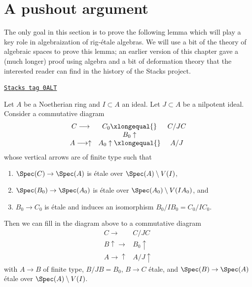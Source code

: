 \section{A pushout argument}
\label{restricted-section-approximation}
The only goal in this section is to prove the following lemma which
will play a key role in algebraization of rig-\'etale algebras.
We will use a bit of the theory of algebraic spaces to prove this lemma;
an earlier version of this chapter gave a (much longer) proof using algebra
and a bit of deformation theory that the interested reader can find in
the history of the Stacks project.

\begin{lemma}
\label{restricted-lemma-lift-approximation}
\href{https://stacks.math.columbia.edu/tag/0ALT}{\texttt{Stacks tag 0ALT}}

Let $A$ be a Noetherian ring and $I \subset A$ an ideal.
Let $J \subset A$ be a nilpotent ideal. Consider a commutative diagram
$$
\begin{array}{ccc}C \longrightarrow & C_0 \xlongequal{} & C/JC \\  & B_0 \uparrow &  \\ A \longrightarrow\uparrow & A_0 \uparrow\xlongequal{} & A/J\end{array}
$$
whose vertical arrows are of finite type such that
\begin{enumerate}
\item $\Spec(C) \to \Spec(A)$ is \'etale over $\Spec(A) \setminus V(I)$,
\item $\Spec(B_0) \to \Spec(A_0)$ is \'etale over
$\Spec(A_0) \setminus V(IA_0)$, and
\item $B_0 \to C_0$ is \'etale and induces an isomorphism
$B_0/IB_0 = C_0/IC_0$.
\end{enumerate}
Then we can fill in the diagram above to a commutative diagram
$$
\begin{array}{cc}C \longrightarrow & C/JC \\ B \uparrow\longrightarrow & B_0 \uparrow \\ A \longrightarrow\uparrow & A/J \uparrow\end{array}
$$
with $A \to B$ of finite type, $B/JB = B_0$, $B \to C$ \'etale, and
$\Spec(B) \to \Spec(A)$ \'etale over $\Spec(A) \setminus V(I)$.
\end{lemma}

